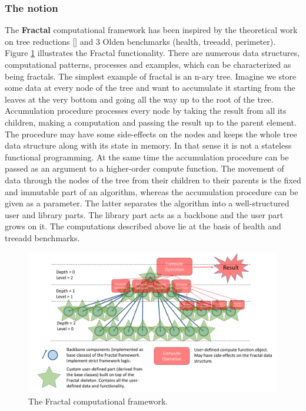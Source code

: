 \subsubsection{The notion}
\quad The \textbf{Fractal} computational framework has been inspired by the theoretical work on tree reductions [] and 3 Olden benchmarks (health, treeadd, perimeter). Figure \ref{fig:fractal} illustrates the Fractal functionality.\newline\null
\quad There are numerous data structures, computational patterns, processes and examples, which can be characterized as being fractals.\newline\null
\quad The simplest example of fractal is an n-ary tree. Imagine we store some data at every node of the tree and want to accumulate it starting from the leaves at the very bottom and going all the way up to the root of the tree. Accumulation procedure processes every node by taking the result from all its children, making a computation and passing the result up to the parent element. The procedure may have some side-effects on the nodes and keeps the whole tree data structure along with its state in memory. In that sense it is not a stateless functional programming. At the same time the accumulation procedure can be passed as an argument to a higher-order compute function. The movement of data through the nodes of the tree from their children to their parents is the fixed and immutable part of an algorithm, whereas the accumulation procedure can be given as a parameter. The latter separates the algorithm into a well-structured user and library parts. The library part acts as a backbone and the user part grows on it. The computations described above lie at the basis of health and treeadd benchmarks.\newline\null
\begin{figure}[ht]
\includegraphics[width=1.0\textwidth]{images/Fractal.pdf}
\caption{The Fractal computational framework.}
\label{fig:fractal}
\end{figure}
